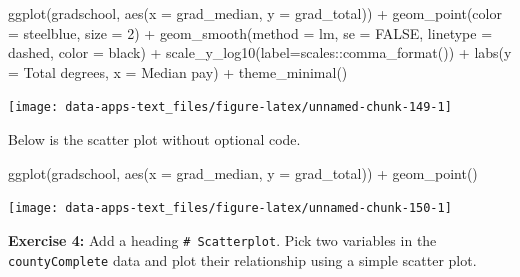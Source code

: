 \documentclass[
]{book}
\makeatletter
\newenvironment{Shaded}{\begin{snugshade}}{\end{snugshade}}
\newcommand{\AttributeTok}[1]{\textcolor[rgb]{0.61,0.61,0.61}{#1}}
\newcommand{\ConstantTok}[1]{\textcolor[rgb]{0,0,0}{#1}}
\newcommand{\DecValTok}[1]{\textcolor[rgb]{0.06,0.06,0.06}{#1}}
\newcommand{\FunctionTok}[1]{\textcolor[rgb]{0,0,0}{#1}}
\newcommand{\NormalTok}[1]{#1}
\newcommand{\SpecialCharTok}[1]{\textcolor[rgb]{0,0,0}{#1}}
\newcommand{\StringTok}[1]{\textcolor[rgb]{0.5,0.5,0.5}{#1}}
\newenvironment{kframe}{%
\medskip{}
\setlength{\fboxsep}{.8em}
 \def\at@end@of@kframe{}%
 \ifinner\ifhmode%
  \def\at@end@of@kframe{\end{minipage}}%
  \begin{minipage}{\columnwidth}%
 \fi\fi%
 \def\FrameCommand##1{\hskip\@totalleftmargin \hskip-\fboxsep
 \colorbox{shadecolor}{##1}\hskip-\fboxsep
     \hskip-\linewidth \hskip-\@totalleftmargin \hskip\columnwidth}%
 \MakeFramed {\advance\hsize-\width
   \@totalleftmargin\z@ \linewidth\hsize
   \@setminipage}}%
 {\par\unskip\endMakeFramed%
 \at@end@of@kframe}
\renewenvironment{Shaded}{\begin{kframe}}{\end{kframe}}
\newenvironment{rmdblock}[1]
  {\begin{shaded*}
  }
  {\end{shaded*}
  }
\newenvironment{learncheck}
  {\begin{rmdblock}{warning}}
  {\end{rmdblock}}
\makeatother
\begin{document}
\begin{Shaded}
\begin{Highlighting}[]
\FunctionTok{ggplot}\NormalTok{(gradschool, }\FunctionTok{aes}\NormalTok{(}\AttributeTok{x =}\NormalTok{ grad\_median, }\AttributeTok{y =}\NormalTok{ grad\_total)) }\SpecialCharTok{+}
  \FunctionTok{geom\_point}\NormalTok{(}\AttributeTok{color =} \StringTok{\textquotesingle{}steelblue\textquotesingle{}}\NormalTok{, }\AttributeTok{size =} \DecValTok{2}\NormalTok{) }\SpecialCharTok{+}
  \FunctionTok{geom\_smooth}\NormalTok{(}\AttributeTok{method =} \StringTok{\textquotesingle{}lm\textquotesingle{}}\NormalTok{, }\AttributeTok{se =} \ConstantTok{FALSE}\NormalTok{, }
              \AttributeTok{linetype =} \StringTok{\textquotesingle{}dashed\textquotesingle{}}\NormalTok{, }\AttributeTok{color =} \StringTok{\textquotesingle{}black\textquotesingle{}}\NormalTok{) }\SpecialCharTok{+}
  \FunctionTok{scale\_y\_log10}\NormalTok{(}\AttributeTok{label=}\NormalTok{scales}\SpecialCharTok{::}\FunctionTok{comma\_format}\NormalTok{()) }\SpecialCharTok{+}
  \FunctionTok{labs}\NormalTok{(}\AttributeTok{y =} \StringTok{\textquotesingle{}Total degrees\textquotesingle{}}\NormalTok{,}
       \AttributeTok{x =} \StringTok{\textquotesingle{}Median pay\textquotesingle{}}\NormalTok{) }\SpecialCharTok{+}
  \FunctionTok{theme\_minimal}\NormalTok{()}
\end{Highlighting}
\end{Shaded}

\begin{center}\texttt{[image: data-apps-text\_files/figure-latex/unnamed-chunk-149-1]} \end{center}

Below is the scatter plot without optional code.

\begin{Shaded}
\begin{Highlighting}[]
\FunctionTok{ggplot}\NormalTok{(gradschool, }\FunctionTok{aes}\NormalTok{(}\AttributeTok{x =}\NormalTok{ grad\_median, }\AttributeTok{y =}\NormalTok{ grad\_total)) }\SpecialCharTok{+}
  \FunctionTok{geom\_point}\NormalTok{()}
\end{Highlighting}
\end{Shaded}

\begin{center}\texttt{[image: data-apps-text\_files/figure-latex/unnamed-chunk-150-1]} \end{center}

\begin{learncheck}
\textbf{Exercise 4:} Add a heading \texttt{\#\ Scatterplot}. Pick two
variables in the \texttt{countyComplete} data and plot their
relationship using a simple scatter plot.
\end{learncheck}
\end{document}
